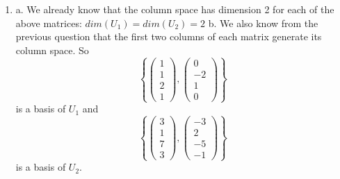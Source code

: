 \documentclass{article}
\newcommand{\chapternumber}{2}
\newenvironment{QandA}{\begin{enumerate}[label=\chapternumber.\arabic*]\bfseries\boldmath}
	{\end{enumerate}}
\newenvironment{answered}{\par\bigskip\normalfont\unboldmath}{}
\begin{document}
\begin{QandA}
\begin{answered}
			b. From our observations before, we see that
			\[\begin{pmatrix}
				1 \\ 1 \\ -1
			\end{pmatrix}\]
			lies in both $U_1$ and $U_2$. The dimension of each of these spaces is 1, so therefore the singleton set containing only this vector acts as a basis for both $U_1$ and $U_2$.
			
			c. We have $U_1=U_2=U_1\cap U_2$, so
			\[\left\{
			\begin{pmatrix}
				1 \\ 1 \\ -1
			\end{pmatrix}
			\right\}\]
			is also a basis for $=U_1\cap U_2$
		\end{answered}
		
		\item
		\begin{answered}
			a. We already know that the column space has dimension 2 for each of the above matrices: $dim(U_1)=dim(U_2)=2$
			b. We also know from the previous question that the first two columns of each matrix generate its column space. So
			\[\left\{
			\begin{pmatrix}
				1 \\ 1 \\ 2 \\ 1
			\end{pmatrix},
			\begin{pmatrix}
				0 \\ -2 \\ 1 \\ 0
			\end{pmatrix}
			\right\}\]
			is a basis of $U_1$ and
						\[\left\{
			\begin{pmatrix}
				3 \\ 1 \\ 7 \\ 3
			\end{pmatrix},
			\begin{pmatrix}
				-3 \\ 2 \\ -5 \\ -1
			\end{pmatrix}
			\right\}\]
			is a basis of $U_2$.
			

\end{answered}
\end{QandA}
\end{document}
